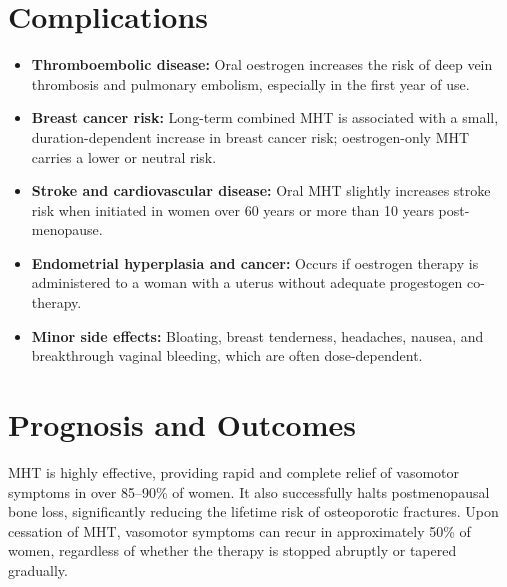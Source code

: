 \section*{Complications}
\begin{itemize}
    \item \textbf{Thromboembolic disease:} Oral oestrogen increases the risk of deep vein thrombosis and pulmonary embolism, especially in the first year of use.
    \item \textbf{Breast cancer risk:} Long-term combined MHT is associated with a small, duration-dependent increase in breast cancer risk; oestrogen-only MHT carries a lower or neutral risk.
    \item \textbf{Stroke and cardiovascular disease:} Oral MHT slightly increases stroke risk when initiated in women over 60 years or more than 10 years post-menopause.
    \item \textbf{Endometrial hyperplasia and cancer:} Occurs if oestrogen therapy is administered to a woman with a uterus without adequate progestogen co-therapy.
    \item \textbf{Minor side effects:} Bloating, breast tenderness, headaches, nausea, and breakthrough vaginal bleeding, which are often dose-dependent.
\end{itemize}

\section*{Prognosis and Outcomes}
MHT is highly effective, providing rapid and complete relief of vasomotor symptoms in over 85--90\% of women. It also successfully halts postmenopausal bone loss, significantly reducing the lifetime risk of osteoporotic fractures. Upon cessation of MHT, vasomotor symptoms can recur in approximately 50\% of women, regardless of whether the therapy is stopped abruptly or tapered gradually.

